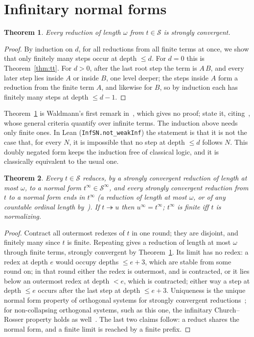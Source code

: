 \documentclass[11pt]{amsart}
\newtheorem{theorem}{Theorem}
\theoremstyle{definition}
\theoremstyle{remark}
\newcommand{\lean}[1]{\texttt{#1}}
\newcommand{\Ter}{\mathcal S}
\newcommand{\iTer}{\mathcal S^{\infty}}
\begin{document}
\section{Infinitary normal forms}\label{sec:nf}

\begin{theorem}\label{thm:sn}
Every reduction of length $\omega$ from $t\in\Ter$ is strongly convergent.
\end{theorem}
\begin{proof}
By induction on $d$, for all reductions from all finite terms at once, we show that only
finitely many steps occur at depth $\le d$. For $d=0$ this is Theorem~\ref{thm:tt}. For
$d>0$, after the last root step the term is $A\,B$, and every later step lies inside $A$ or
inside $B$, one level deeper; the steps inside $A$ form a reduction from the finite term $A$,
and likewise for $B$, so by induction each has finitely many steps at depth $\le d-1$.
\end{proof}

Theorem~\ref{thm:sn} is Waldmann's first remark in~\citep[\S7.6]{waldmann-thesis}, which
gives no proof; \citet{dots} state it, citing~\citep{klop-devrijer,egh09}, whose general
criteria quantify over infinite terms. The induction above needs only finite ones. In Lean
(\lean{InfSN.not\_weakInf}) the statement is that it is not the case that, for every $N$, it is
impossible that no step at depth $\le d$ follows $N$. This doubly negated form keeps the
induction free of classical logic, and it is classically equivalent to the usual one.

\begin{theorem}\label{thm:unf}
Every $t\in\Ter$ reduces, by a strongly convergent reduction of length at most $\omega$, to a
normal form $t^\infty\in\iTer$, and every strongly convergent reduction from $t$ to a normal
form ends in $t^\infty$ (a reduction of length at most $\omega$, or of any countable ordinal
length by~\citep{kksv}). If $t\twoheadrightarrow u$ then $u^\infty=t^\infty$; $t^\infty$ is
finite iff $t$ is normalizing.
\end{theorem}
\begin{proof}
Contract all outermost redexes of $t$ in one round; they are disjoint, and finitely many
since $t$ is finite. Repeating gives a reduction of length at most $\omega$ through finite
terms, strongly convergent by Theorem~\ref{thm:sn}. Its limit has no redex: a redex at depth
$e$ would occupy depths $\le e+3$, which are stable from some round on; in that round either
the redex is outermost, and is contracted, or it lies below an outermost redex at depth
$<e$, which is contracted; either way a step at depth $\le e$ occurs after the last step at
depth $\le e+3$. Uniqueness is the unique
normal form property of orthogonal systems for strongly convergent
reductions~\citep{kksv,terese}; for non-collapsing orthogonal systems, such as this one, the
infinitary Church--Rosser property holds as well~\citep{kksv}. The last two claims follow: a reduct shares the normal form,
and a finite limit is reached by a finite prefix.
\end{proof}
\end{document}
